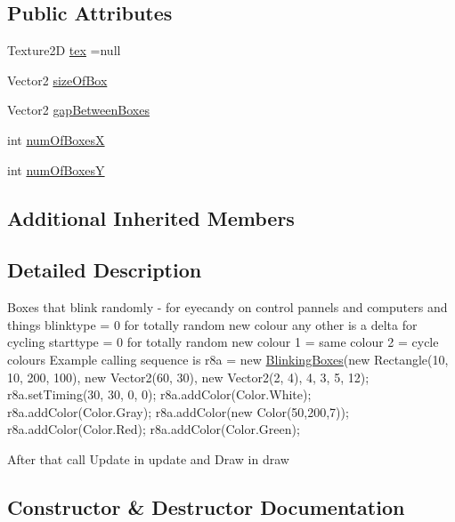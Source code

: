 \subsection*{Public Attributes}
\begin{DoxyCompactItemize}
\item 
Texture2D \mbox{\hyperlink{class_r_c___framework_1_1_blinking_boxes_a14d8576628e55d06cc4926e6658b7de5}{tex}} =null
\item 
Vector2 \mbox{\hyperlink{class_r_c___framework_1_1_blinking_boxes_ad40a2c29d7259bc269f9e27a8c45b20c}{size\+Of\+Box}}
\item 
Vector2 \mbox{\hyperlink{class_r_c___framework_1_1_blinking_boxes_afb0583f0a41e8f9256825893489cf33e}{gap\+Between\+Boxes}}
\item 
int \mbox{\hyperlink{class_r_c___framework_1_1_blinking_boxes_a35ba39213cc4b79938efe4c72bfed0ce}{num\+Of\+BoxesX}}
\item 
int \mbox{\hyperlink{class_r_c___framework_1_1_blinking_boxes_a4f5e0f431beee9bdcd4d52bf4fded6b3}{num\+Of\+BoxesY}}
\end{DoxyCompactItemize}
\subsection*{Additional Inherited Members}


\subsection{Detailed Description}
Boxes that blink randomly -\/ for eyecandy on control pannels and computers and things blinktype = 0 for totally random new colour any other is a delta for cycling starttype = 0 for totally random new colour 1 = same colour 2 = cycle colours Example calling sequence is r8a = new \mbox{\hyperlink{class_r_c___framework_1_1_blinking_boxes}{Blinking\+Boxes}}(new Rectangle(10, 10, 200, 100), new Vector2(60, 30), new Vector2(2, 4), 4, 3, 5, 12); r8a.\+set\+Timing(30, 30, 0, 0); r8a.\+add\+Color(Color.\+White); r8a.\+add\+Color(Color.\+Gray); r8a.\+add\+Color(new Color(50,200,7)); r8a.\+add\+Color(Color.\+Red); r8a.\+add\+Color(Color.\+Green); 

After that call Update in update and Draw in draw 

\subsection{Constructor \& Destructor Documentation}
\mbox{\label{class_r_c___framework_1_1_blinking_boxes_a16ee508e4fa77310bb4305a16a199e95}} 
